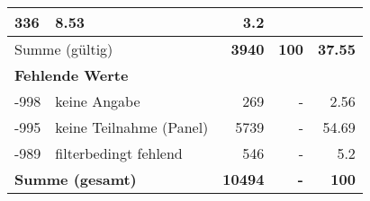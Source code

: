 \begin{longtable}{lXrrr}
       \num{336} &
       \num[round-mode=places,round-precision=2]{8,53} &
         \num[round-mode=places,round-precision=2]{3,2} \\
     \midrule
     \multicolumn{2}{l}{Summe (gültig)} &
       \textbf{\num{3940}} &
     \textbf{100} &
       \textbf{\num[round-mode=places,round-precision=2]{37,55}} \\
     \multicolumn{5}{l}{\textbf{Fehlende Werte}}\\
       -998 &
       keine Angabe &
         \num{269} &
        - &
         \num[round-mode=places,round-precision=2]{2,56} \\
       -995 &
       keine Teilnahme (Panel) &
         \num{5739} &
        - &
         \num[round-mode=places,round-precision=2]{54,69} \\
       -989 &
       filterbedingt fehlend &
         \num{546} &
        - &
         \num[round-mode=places,round-precision=2]{5,2} \\
     \midrule
     \multicolumn{2}{l}{\textbf{Summe (gesamt)}} &
          \textbf{\num{10494}} &
        \textbf{-} &
        \textbf{100} \\
     \bottomrule
     \end{longtable}
     

